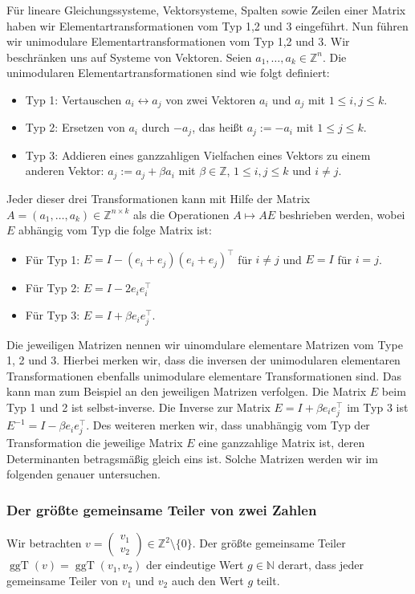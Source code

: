\documentclass[
a4paper,12pt,
bibliography=totocnumbered,
numbers=noenddot,
]{scrartcl}
\numberwithin{equation}{subsection}
\newcommand{\N}{\mathbb N}
\newcommand{\Z}{\mathbb Z}
\newcommand{\ggT}{\operatorname{ggT}} %
\theoremstyle{plain}
\theoremstyle{definition}
\begin{document}
Für lineare Gleichungssysteme, Vektorsysteme, Spalten sowie Zeilen einer Matrix haben wir Elementartransformationen vom Typ 1,2 und 3 eingeführt. Nun führen wir unimodulare Elementartransformationen vom Typ 1,2 und 3. Wir beschränken uns auf Systeme von Vektoren. Seien $a_1,\ldots, a_k \in \Z^n$. Die unimodularen Elementartransformationen sind wie folgt definiert: 
\begin{itemize} 
	\item[] Typ 1: Vertauschen $a_i \leftrightarrow a_j$ von zwei Vektoren $a_i$ und $a_j$ mit $1 \le i, j \le k$. 
	\item[] Typ 2: Ersetzen von $a_i$ durch $- a_j$, das heißt $a_j := - a_i$ mit $1 \le j \le k$. 
	\item[] Typ 3: Addieren eines ganzzahligen Vielfachen eines Vektors zu einem anderen Vektor: $a_j := a_j + \beta a_i$ mit $\beta \in \Z$, $1 \le i,j \le k$ und $i \ne j$. 
\end{itemize} 
Jeder dieser drei Transformationen kann mit Hilfe der Matrix $A = (a_1,\ldots,a_k) \in \Z^{n \times k}$ als die Operationen $A \mapsto A E$ beshrieben werden, wobei $E$  abhängig vom Typ die folge Matrix ist: 
\begin{itemize} 
	\item[] Für Typ 1: $E = I - (e_i+e_j)(e_i+e_j)^\top$ für $i \ne j$ und $E = I$ für $i = j$. 
	\item[] Für Typ 2:  $E = I - 2 e_i e_i^\top$ 
	\item[] Für Typ 3: $E = I + \beta e_i e_j^\top$. 
\end{itemize} 
Die jeweiligen Matrizen nennen wir uinomdulare elementare Matrizen vom Type 1, 2 und 3. Hierbei merken wir, dass die inversen der unimodularen elementaren Transformationen ebenfalls unimodulare elementare Transformationen sind. Das kann man zum Beispiel an den jeweiligen Matrizen verfolgen. Die Matrix $E$ beim Typ 1 und 2 ist selbst-inverse. Die Inverse zur Matrix $E = I + \beta e_i e_j^\top$ im Typ 3 ist $E^{-1} = I - \beta e_i e_j^\top$. Des weiteren merken wir, dass unabhängig vom Typ der Transformation die jeweilige Matrix $E$ eine ganzzahlige Matrix ist, deren Determinanten betragsmäßig gleich eins ist. Solche Matrizen werden wir im folgenden genauer untersuchen. 

\subsubsection{Der größte gemeinsame Teiler von zwei Zahlen}

\label{ggT:zahlen} 
Wir betrachten $v = \begin{pmatrix} v_1 \\ v_2 \end{pmatrix} \in \Z^2 \setminus \{0\}$. Der größte gemeinsame Teiler $\ggT(v) = \ggT(v_1,v_2)$ der eindeutige Wert $g \in \N$ derart, dass jeder gemeinsame Teiler von $v_1$ und $v_2$ auch den Wert $g$ teilt. 
\end{document}
